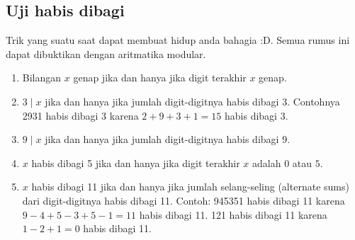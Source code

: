 \subsection{Uji habis dibagi}
    Trik yang suatu saat dapat membuat hidup anda bahagia :D. Semua rumus ini dapat dibuktikan dengan aritmatika modular.
    \begin{enumerate}
        \item Bilangan $x$ genap jika dan hanya jika digit terakhir $x$ genap.
        \item $3 \mid x$ jika dan hanya jika jumlah digit-digitnya habis dibagi $3$. Contohnya 2931 habis dibagi 3 karena $2+9+3+1=15$ habis dibagi 3.
        \item $9 \mid x$ jika dan hanya jika jumlah digit-digitnya habis dibagi $9$.
        \item $x$ habis dibagi 5 jika dan hanya jika digit terakhir $x$ adalah $0$ atau $5$.
        \item $x$ habis dibagi 11 jika dan hanya jika jumlah selang-seling (alternate sums) dari digit-digitnya habis dibagi 11. Contoh: 945351 habis dibagi 11 karena $9-4+5-3+5-1=11$ habis dibagi 11. 121 habis dibagi 11 karena $1-2+1=0$ habis dibagi 11.
    \end{enumerate}


    
    